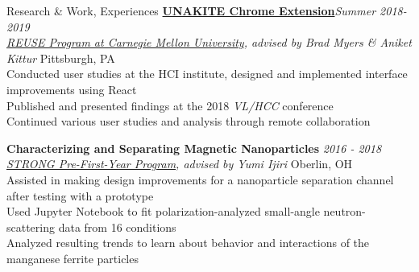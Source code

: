 \documentclass{resume}
\begin{document}
\begin{rSection}{Research \& Work, Experiences}
{\bf \href{https://unakite.info/}{UNAKITE Chrome Extension}}\hfill {\em Summer 2018-2019} \\
{\em \href{https://www.cmu.edu/scs/isr/reuse/}{REUSE Program at Carnegie Mellon University}, advised by Brad Myers \& Aniket Kittur} \hfill { Pittsburgh, PA}\\
Conducted user studies at the HCI institute, designed and implemented interface improvements using React \\
Published and presented findings at the 2018 {\em VL/HCC} conference \\
Continued various user studies and analysis through remote collaboration

{\bf Characterizing and Separating Magnetic Nanoparticles } \hfill {\em 2016 - 2018}\\
{\em \href{https://www.oberlin.edu/undergraduate-research/programs/strong}{STRONG Pre-First-Year Program}, advised by Yumi Ijiri } \hfill { Oberlin, OH}\\
Assisted in making design improvements for a nanoparticle separation channel after testing with a prototype \\
Used Jupyter Notebook to fit polarization-analyzed small-angle neutron-scattering data from 16 conditions \\
Analyzed resulting trends to learn about behavior and interactions of the manganese ferrite particles 

\end{rSection}
\end{document}
